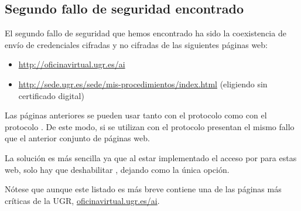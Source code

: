 \subsection*{Segundo fallo de seguridad encontrado}

El segundo fallo de seguridad que hemos encontrado ha sido la coexistencia de envío de credenciales cifradas y no cifradas de las siguientes páginas web:

\begin{itemize}
  \item \url{http://oficinavirtual.ugr.es/ai}
  \item \url{http://sede.ugr.es/sede/mis-procedimientos/index.html} (eligiendo sin certificado digital)
\end{itemize}
Las páginas anteriores se pueden usar tanto con el protocolo   como con el protocolo  . De este modo, si se utilizan con el protocolo   presentan el mismo fallo que el anterior conjunto de páginas web.

La solución es más sencilla ya que al estar implementado el acceso por   para estas web, solo hay que deshabilitar , dejando    como la única opción.

Nótese que aunque este listado es más breve contiene una de las páginas más críticas de la UGR, \href{http://oficinavirtual.ugr.es/ai}{oficinavirtual.ugr.es/ai}.
